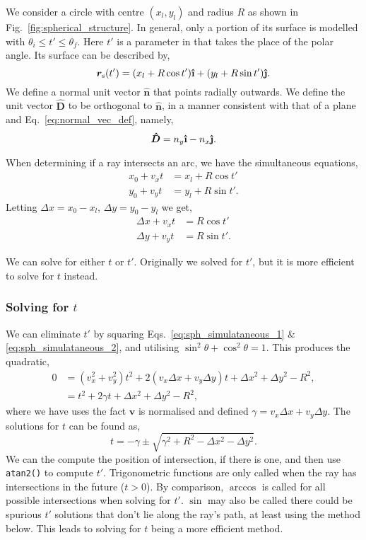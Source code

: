 \documentclass{article}
\let\vec \bm
\newcommand{\uveci}{{\bm{\hat{\textnormal{\bfseries\i}}}}}
\newcommand{\uvecj}{{\bm{\hat{\textnormal{\bfseries\j}}}}}
\begin{document}
We consider a circle with centre $(x_l, y_l)$ and radius $R$ as shown in Fig.~\ref{fig:spherical_structure}. In general, only a portion of its surface is modelled with $\theta_i \le t' \le \theta_f$. Here $t'$ is a parameter in that takes the place of the polar angle. Its surface can be described by,
\begin{equation}
    \vec{r}_\mathrm{s}(t')
    =
    (x_l + R\cos t') \uveci
    +
    (y_l + R\sin t') \uvecj.
\end{equation}
We define a normal unit vector $\vec{\hat{n}}$ that points radially outwards. We define the unit vector $\vec{\hat{D}}$ to be orthogonal to $\vec{\hat{n}}$, in a manner consistent with that of a plane and Eq.~\ref{eq:normal_vec_def}, namely,
\begin{equation}
    \vec{\hat{D}}
    =
    n_y \uveci
    -
    n_x \uvecj.
\end{equation}

When determining if a ray intersects an arc, we have the simultaneous equations,
\begin{align}
    x_0 + v_x t &= x_l + R\cos t' \\
    y_0 + v_y t &= y_l + R\sin t'.
\end{align}
Letting $\Delta x = x_0 - x_l$, $\Delta y = y_0 - y_l$ we get,
\begin{align}
\label{eq:sph_simulataneous_1}
    \Delta x + v_x t &= R\cos t' \\
\label{eq:sph_simulataneous_2}
    \Delta y + v_y t &= R\sin t'.
\end{align}

We can solve for either $t$ or $t'$. Originally we solved for $t'$, but it is more efficient to solve for $t$ instead.

\subsubsection{Solving for $t$}
We can eliminate $t'$ by squaring Eqs.~\ref{eq:sph_simulataneous_1} \& \ref{eq:sph_simulataneous_2}, and utilising $\sin^2 \theta + \cos^2 \theta = 1$. This produces the quadratic,
\begin{align}
    0
    &=
    (v_x^2 + v_y^2)t^2
    +
    2(v_x \Delta x + v_y \Delta y)t
    +
    \Delta x^2 + \Delta y^2 - R^2, \\
    &=
    t^2
    +
    2 \gamma t
    +
    \Delta x^2 + \Delta y^2 - R^2,
\end{align}
where we have uses the fact $\vec{v}$ is normalised and defined $\gamma = v_x \Delta x + v_y \Delta y$. The solutions for $t$ can be found as,
\begin{equation}
    t
    =
    -\gamma
    \pm
    \sqrt{\gamma^2 + R^2 - \Delta x^2 - \Delta y^2}.
\end{equation}
We can the compute the position of intersection, if there is one, and then use \texttt{atan2()} to compute $t'$. Trigonometric functions are only called when the ray has intersections in the future ($t>0$). By comparison, $\arccos$ is called for all possible intersections when solving for $t'$. $\sin$ may also be called there could be spurious $t'$ solutions that don't lie along the ray's path, at least using the method below. This leads to solving for $t$ being a more efficient method.
\end{document}
